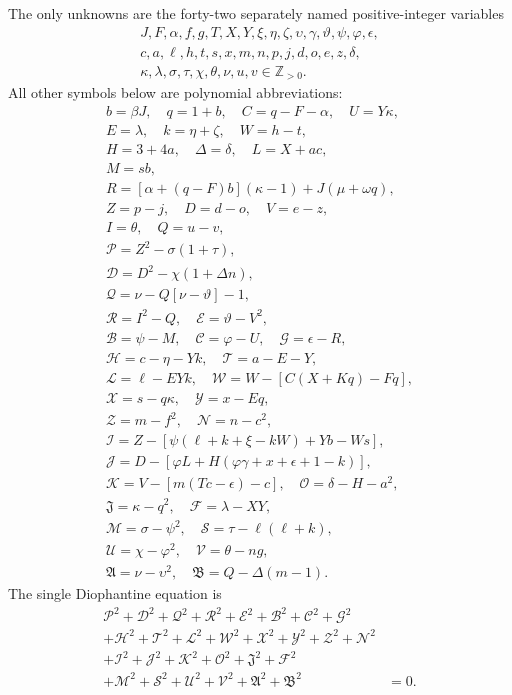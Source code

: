 The only unknowns are the forty-two separately named positive-integer variables
\[
\begin{gathered}J,F,\alpha,f,g,T,X,Y,\xi,\eta,\zeta,\upsilon,\gamma,\vartheta,\psi,\varphi,\epsilon,\\
c,a,\ell,h,t,s,x,m,n,p,j,d,o,e,z,\delta,\\
\kappa,\lambda,\sigma,\tau,\chi,\theta,\nu,u,v\in\mathbb Z_{>0}.\end{gathered}
\]
All other symbols below are polynomial abbreviations:
\[
\begin{gathered}
b=\beta J,\quad q=1+b,\quad C=q-F-\alpha,\quad U=Y\kappa,\\
E=\lambda,\quad k=\eta+\zeta,\quad W=h-t,\\
H=3+4a,\quad\Delta=\delta,\quad L=X+ac,\\
M=sb,\\
R=[\alpha+(q-F)b](\kappa-1)+J(\mu+\omega q),\\
Z=p-j,\quad D=d-o,\quad V=e-z,\\
I=\theta,\quad Q=u-v,\\
\mathcal{P}=Z^2-\sigma(1+\tau),\\
\mathcal{D}=D^2-\chi(1+\Delta n),\\
\mathcal{Q}=\nu-Q[\nu-\vartheta]-1,\\
\mathcal{R}=I^2-Q,\quad \mathcal{E}=\vartheta-V^2,\\
\mathcal{B}=\psi-M,\quad \mathcal{C}=\varphi-U,\quad \mathcal{G}=\epsilon-R,\\
\mathcal{H}=c-\eta-Yk,\quad \mathcal{T}=a-E-Y,\\
\mathcal{L}=\ell-EYk,\quad \mathcal{W}=W-[C(X+Kq)-Fq],\\
\mathcal{X}=s-q\kappa,\quad \mathcal{Y}=x-Eq,\\
\mathcal{Z}=m-f^2,\quad \mathcal{N}=n-c^2,\\
\mathcal{I}=Z-[\psi(\ell+k+\xi-kW)+Yb-Ws],\\
\mathcal{J}=D-[\varphi L+H(\varphi\gamma+x+\epsilon+1-k)],\\
\mathcal{K}=V-[m(Tc-\epsilon)-c],\quad\mathcal{O}=\delta-H-a^2,\\
\mathfrak{J}=\kappa-q^2,\quad\mathcal{F}=\lambda-XY,\\
\mathcal{M}=\sigma-\psi^2,\quad\mathcal{S}=\tau-\ell(\ell+k),\\
\mathcal{U}=\chi-\varphi^2,\quad\mathcal{V}=\theta-ng,\\
\mathfrak{A}=\nu-\upsilon^2,\quad\mathfrak{B}=Q-\Delta(m-1).
\end{gathered}
\]
The single Diophantine equation is
\[
\begin{split}
\mathcal{P}^2+\mathcal{D}^2+\mathcal{Q}^2+\mathcal{R}^2+\mathcal{E}^2+\mathcal{B}^2+\mathcal{C}^2+\mathcal{G}^2 &\\
+\mathcal{H}^2+\mathcal{T}^2+\mathcal{L}^2+\mathcal{W}^2+\mathcal{X}^2+\mathcal{Y}^2+\mathcal{Z}^2+\mathcal{N}^2 &\\
+\mathcal{I}^2+\mathcal{J}^2+\mathcal{K}^2+\mathcal{O}^2+\mathfrak{J}^2+\mathcal{F}^2 &\\
+\mathcal{M}^2+\mathcal{S}^2+\mathcal{U}^2+\mathcal{V}^2+\mathfrak{A}^2+\mathfrak{B}^2 &= 0.
\end{split}
\]
